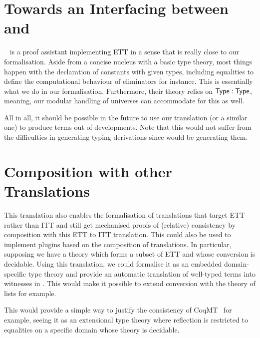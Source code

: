 \section{Towards an Interfacing between \Andromeda and \Coq}

\Andromeda~ is a proof assistant implementing \acrshort{ETT}
in a sense that is really close to our formalisation. Aside from a concise
nucleus with a basic type theory, most things happen with the declaration of
constants with given types, including equalities to define the computational
behaviour of eliminators for instance.
This is essentially what we do in our formalisation.
Furthermore, their theory relies on $\mathsf{Type} : \mathsf{Type}$, meaning, our modular
handling of universes can accommodate for this as well.

All in all, it should be possible in the future to use our translation
(or a similar one) to produce \Coq terms out of \Andromeda developments.
%
Note that this would not suffer from the difficulties in generating typing
derivations since \Andromeda would be generating them.

\section{Composition with other Translations}

This translation also enables the formalisation of translations that
target \acrshort{ETT} rather than \acrshort{ITT} and still get mechanised proofs
of (relative) consistency by composition with this \acrshort{ETT} to
\acrshort{ITT} translation.
This could also be used to implement plugins based on the composition of
translations. In particular, supposing we have a theory which forms a
subset of \acrshort{ETT} and whose conversion is decidable. Using this
translation, we could formalise it as an embedded domain-specific type theory
and provide an automatic translation of well-typed terms into witnesses in
\Coq. This would make it possible to extend conversion with the theory
of lists for example.

This would provide a simple way to justify the consistency of
\acrshort{CoqMT}~ for example, seeing it
as an extensional type theory where reflection is restricted to equalities on a
specific domain whose theory is decidable.